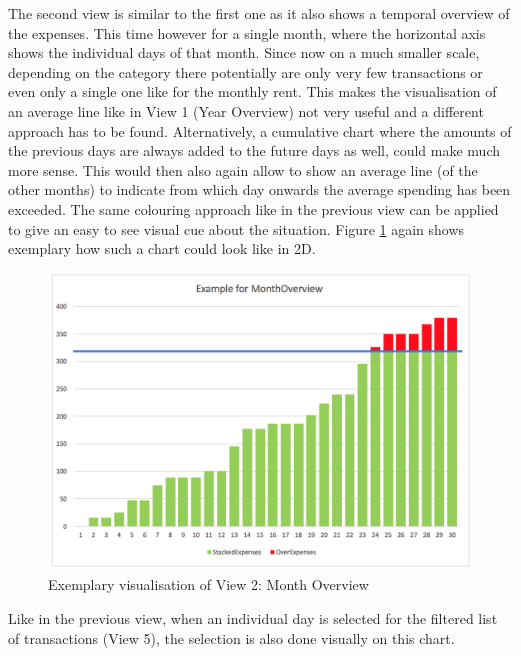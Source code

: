The second view is similar to the first one as it also shows a temporal overview of the expenses. This time however for a single month, where the horizontal axis shows the individual days of that month. Since now on a much smaller scale, depending on the category there potentially are only very few transactions or even only a single one like for the monthly rent. This makes the visualisation of an average line like in View 1 (Year Overview) not very useful and a different approach has to be found. \newline
Alternatively, a cumulative chart where the amounts of the previous days are always added to the future days as well, could make much more sense. This would then also again allow to show an average line (of the other months) to indicate from which day onwards the average spending has been exceeded. The same colouring approach like in the previous view can be applied to give an easy to see visual cue about the situation. Figure \ref{fig:view2chart} again shows exemplary how such a chart could look like in 2D.
\begin{figure}[h]
	\begin{center}
		\includegraphics[width=14cm]{03_Figures/07_Suggestion/View2_MonthOverview.png}
		\caption{Exemplary visualisation of View 2: Month Overview}
		\label{fig:view2chart}
	\end{center}
\end{figure}
Like in the previous view, when an individual day is selected for the filtered list of transactions (View 5), the selection is also done visually on this chart.



